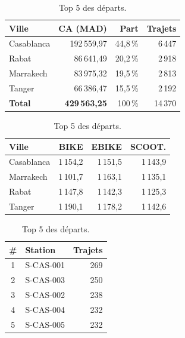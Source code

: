 \documentclass[10pt,a4paper]{article}
\begin{document}
\begin{table}[!htbp]
\centering\footnotesize
\begin{minipage}[t]{0.37\linewidth}\centering
\begin{tabular}{@{}lrrr@{}}
\toprule
\textbf{Ville} & \textbf{CA (MAD)} & \textbf{Part} & \textbf{Trajets} \\
\midrule
Casablanca & 192\,559,97 & 44,8\,\% & 6\,447 \\
Rabat      &  86\,641,49 & 20,2\,\% & 2\,918 \\
Marrakech  &  83\,975,32 & 19,5\,\% & 2\,813 \\
Tanger     &  66\,386,47 & 15,5\,\% & 2\,192 \\
\midrule
\textbf{Total} & \textbf{429\,563,25} & 100\,\% & 14\,370 \\
\bottomrule
\end{tabular}
\caption{Chiffre d'affaires par ville.}
\label{tab:ca}
\end{minipage}\hfill
\begin{minipage}[t]{0.36\linewidth}\centering
\begin{tabular}{@{}lrrr@{}}
\toprule
\textbf{Ville} & \textbf{BIKE} & \textbf{EBIKE} & \textbf{SCOOT.} \\
\midrule
Casablanca & 1\,154,2 & 1\,151,5 & 1\,143,9 \\
Marrakech  & 1\,101,7 & 1\,163,1 & 1\,135,1 \\
Rabat      & 1\,147,8 & 1\,142,3 & 1\,125,3 \\
Tanger     & 1\,190,1 & 1\,178,2 & 1\,142,6 \\
\bottomrule
\end{tabular}
\caption{Durée moyenne (secondes).}
\label{tab:duree}
\end{minipage}\hfill
\begin{minipage}[t]{0.22\linewidth}\centering
\begin{tabular}{@{}clr@{}}
\toprule
\textbf{\#} & \textbf{Station} & \textbf{Trajets} \\
\midrule
1 & S-CAS-001 & 269 \\
2 & S-CAS-003 & 250 \\
3 & S-CAS-002 & 238 \\
4 & S-CAS-004 & 232 \\
5 & S-CAS-005 & 232 \\
\bottomrule
\end{tabular}
\caption{Top 5 des départs.}
\label{tab:top5}
\end{minipage}
\end{table}
\end{document}
